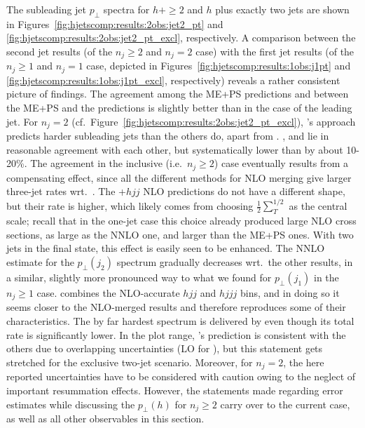 The subleading jet $p_\perp$ spectra for $h+\ge2$ and $h$ plus exactly
two jets are shown in Figures~\ref{fig:hjetscomp:results:2obs:jet2_pt}
and \ref{fig:hjetscomp:results:2obs:jet2_pt_excl}, respectively. A
comparison between the second jet results (of the
$n_j\ge2$ and $n_j=2$ case) with the first jet results (of the
$n_j\ge1$ and $n_j=1$ case, depicted in
Figures~\ref{fig:hjetscomp:results:1obs:j1pt} and
\ref{fig:hjetscomp:results:1obs:j1pt_excl}, respectively) reveals a
rather consistent picture of findings. The agreement among the ME+PS
predictions and between the ME+PS and the \Powheg predictions is
slightly better than in the case of the leading jet. For $n_j=2$
(cf.~Figure~\ref{fig:hjetscomp:results:2obs:jet2_pt_excl}), \Powheg's
\NNLOPS approach predicts harder subleading jets than the others do,
apart from \Hej. \MGaMC, \Sherpa and \Herwig lie in reasonable
agreement with each other, but systematically lower than \Powheg by
about 10-20\%. The agreement in the inclusive (i.e.~$n_j\ge2$) case
eventually results from a compensating effect, since all the different
methods for NLO merging give larger three-jet rates wrt.~\Powheg. The
\GoSam{}+\Sherpa $hjj$ NLO predictions do not have a different shape,
but their rate is higher, which likely comes from choosing
$\tfrac{1}{2}\sum_T^{1/2}$ as the central scale; recall that in the
one-jet case this choice already produced large NLO cross sections, as
large as the NNLO one, and larger than the ME+PS ones. With two jets
in the final state, this effect is easily seen to be enhanced. The
\Loopsim NNLO estimate for the $p_\perp(j_2)$ spectrum gradually
decreases wrt.~the other \GoSam results, in a similar, slightly more
pronounced way to what we found for $p_\perp(j_1)$ in the $n_j\ge1$
case. 
\Loopsim combines the NLO-accurate $hjj$ and $hjjj$ bins, and in doing
so it seems closer to the NLO-merged results and therefore reproduces
some of their characteristics. The by far hardest spectrum is
delivered by \Hej even though its total rate is significantly lower. 
In the plot range, \Hej's prediction is consistent with the others due 
to overlapping uncertainties (LO for \Hej), but this statement gets
stretched for the exclusive two-jet scenario. Moreover, for $n_j=2$,
the here reported uncertainties have to be considered with caution
owing to the neglect of important resummation effects. However, the
statements made regarding error estimates while discussing the
$p_\perp(h)$ for $n_j\ge2$ carry over to the current case, as well as
all other observables in this section.

